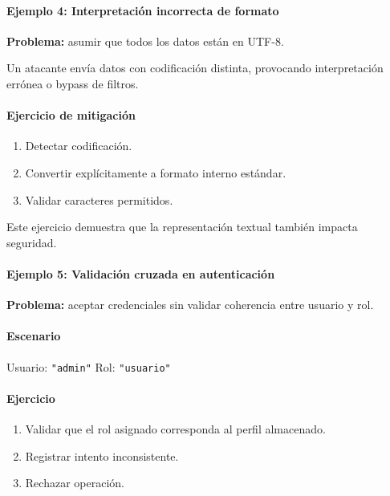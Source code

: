 \documentclass[12pt,twoside]{book}
\begin{document}
						\paragraph{Ejemplo 4: Interpretación incorrecta de formato}
						
						\noindent
						\textbf{Problema:} asumir que todos los datos están en UTF-8.
						
						Un atacante envía datos con codificación distinta, provocando interpretación errónea o bypass de filtros.
						
						\paragraph{Ejercicio de mitigación}
						
						\begin{enumerate}
							\item Detectar codificación.
							\item Convertir explícitamente a formato interno estándar.
							\item Validar caracteres permitidos.
						\end{enumerate}
						
						\noindent
						Este ejercicio demuestra que la representación textual también impacta seguridad.
						
						\paragraph{Ejemplo 5: Validación cruzada en autenticación}
						
						\noindent
						\textbf{Problema:} aceptar credenciales sin validar coherencia entre usuario y rol.
						
						\paragraph{Escenario}
						
						Usuario: \texttt{"admin"}  
						Rol: \texttt{"usuario"}
						
						\paragraph{Ejercicio}
						
						\begin{enumerate}
							\item Validar que el rol asignado corresponda al perfil almacenado.
							\item Registrar intento inconsistente.
							\item Rechazar operación.
						\end{enumerate}
						
\end{document}

